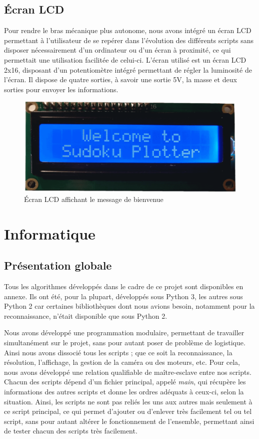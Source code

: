 \documentclass[12pt,a4paper]{report}
\begin{document}
\section{Écran LCD}
Pour rendre le bras mécanique plus autonome, nous avons intégré un écran LCD permettant à l'utilisateur de se repérer dans l'évolution des différents scripts sans disposer nécessairement d'un ordinateur ou d'un écran à proximité, ce qui permettait une utilisation facilitée de celui-ci. L'écran utilisé est un écran LCD 2x16, disposant d'un potentiomètre intégré permettant de régler la luminosité de l'écran. Il dispose de quatre sorties, à savoir une sortie 5V, la masse et deux sorties pour envoyer les informations.

\begin{figure}[!h]
 \center
 \includegraphics[scale=0.3]{../pictures/ecran_lcd}
 \caption{\'{E}cran LCD affichant le message de bienvenue}
\end{figure}


	\chapter{Informatique}
\section{Présentation globale}
	Tous les algorithmes développés dans le cadre de ce projet sont disponibles en annexe. Ils ont été, pour la plupart, développés sous Python 3, les autres sous Python 2 car certaines bibliothèques dont nous avions besoin, notamment pour la reconnaissance, n'était disponible que sous Python 2. 
	
	Nous avons développé une programmation modulaire, permettant de travailler simultanément sur le projet, sans pour autant poser de problème de logistique. Ainsi nous avons dissocié tous les scripts ; que ce soit la reconnaissance, la résolution, l'affichage, la gestion de la caméra ou des moteurs, etc. Pour cela, nous avons développé une relation qualifiable de maître-esclave entre nos scripts. Chacun des scripts dépend d'un fichier principal, appelé \emph{main}, qui récupère les informations des autres scripts et donne les ordres adéquats à ceux-ci, selon la situation. Ainsi, les scripts ne sont pas reliés les uns aux autres mais seulement à ce script principal, ce qui permet d'ajouter ou d'enlever très facilement tel ou tel script, sans pour autant altérer le fonctionnement de l'ensemble, permettant ainsi de tester chacun des scripts très facilement.
	
\end{document}

